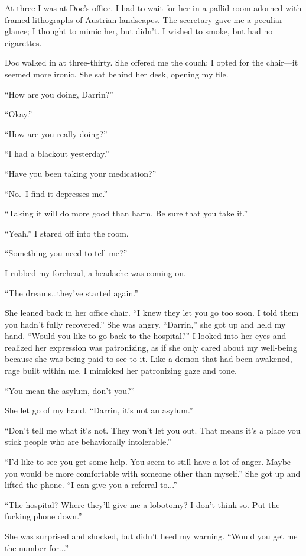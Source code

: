 \documentclass[
]{article}
\begin{document}
At three I was at Doc's office. I had to wait for her in a pallid room
adorned with framed lithographs of Austrian landscapes. The secretary
gave me a peculiar glance; I thought to mimic her, but didn't. I wished
to smoke, but had no cigarettes.

Doc walked in at three-thirty. She offered me the couch; I opted for the
chair---it seemed more ironic. She sat behind her desk, opening my file.

``How are you doing, Darrin?''

``Okay.''

``How are you really doing?''

``I had a blackout yesterday.''

``Have you been taking your medication?''

``No.~I find it depresses me.''

``Taking it will do more good than harm. Be sure that you take it.''

``Yeah.'' I stared off into the room.

``Something you need to tell me?''

I rubbed my forehead, a headache was coming on.

``The dreams\ldots they've started again.''

She leaned back in her office chair. ``I knew they let you go too soon.
I told them you hadn't fully recovered.'' She was angry. ``Darrin,'' she
got up and held my hand. ``Would you like to go back to the hospital?''
I looked into her eyes and realized her expression was patronizing, as
if she only cared about my well-being because she was being paid to see
to it. Like a demon that had been awakened, rage built within me. I
mimicked her patronizing gaze and tone.

``You mean the asylum, don't you?''

She let go of my hand. ``Darrin, it's not an asylum.''

``Don't tell me what it's not. They won't let you out. That means it's a
place you stick people who are behaviorally intolerable.''

``I'd like to see you get some help. You seem to still have a lot of
anger. Maybe you would be more comfortable with someone other than
myself.'' She got up and lifted the phone. ``I can give you a referral
to...''

``The hospital? Where they'll give me a lobotomy? I don't think so. Put
the fucking phone down.''

She was surprised and shocked, but didn't heed my warning. ``Would you
get me the number for...''
\end{document}
